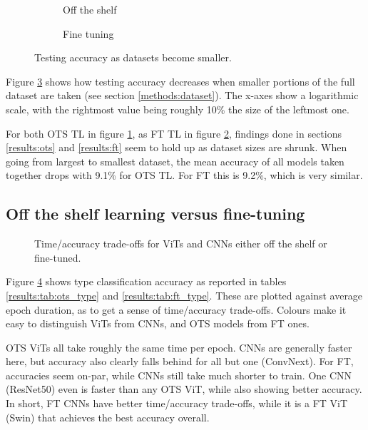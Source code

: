 \begin{figure}
    \centering
    \begin{subfigure}{0.45\textwidth}
    \def\svgwidth{7.7cm}
    
    \caption{Off the shelf}
    \label{results:img:ots_scale}
    \end{subfigure}
    \hfill
    \begin{subfigure}{0.45\textwidth}
    \def\svgwidth{7.7cm}
    
    \caption{Fine tuning}
    \label{results:img:ft_scale}
    \end{subfigure}
    \caption{Testing accuracy as datasets become smaller.}
    \label{results:img:scale}
\end{figure}

Figure \ref{results:img:scale} shows how testing accuracy decreases when smaller portions of the full dataset are taken (see section \ref{methods:dataset}). The x-axes show a logarithmic scale, with the rightmost value being roughly 10\% the size of the leftmost one.

For both OTS TL in figure \ref{results:img:ots_scale}, as FT TL in figure \ref{results:img:ft_scale}, findings done in sections \ref{results:ots} and \ref{results:ft} seem to hold up as dataset sizes are shrunk. When going from largest to smallest dataset, the mean accuracy of all models taken together drops with 9.1\% for OTS TL. For FT this is 9.2\%, which is very similar.

\subsection{Off the shelf learning versus fine-tuning}

\begin{figure}
    \centering
    \def\svgwidth{7.7cm}
    
    \caption{Time/accuracy trade-offs for ViTs and CNNs either off the shelf or fine-tuned.}
    \label{results:img:ots_vs_ft_type}
\end{figure}


Figure \ref{results:img:ots_vs_ft_type} shows type classification accuracy as reported in tables \ref{results:tab:ots_type} and \ref{results:tab:ft_type}. These are plotted against average epoch duration, as to get a sense of time/accuracy trade-offs. Colours make it easy to distinguish ViTs from CNNs, and OTS models from FT ones.

OTS ViTs all take roughly the same time per epoch. CNNs are generally faster here, but accuracy also clearly falls behind for all but one (ConvNext). For FT, accuracies seem on-par, while CNNs still take much shorter to train. One CNN (ResNet50) even is faster than any OTS ViT, while also showing better accuracy. In short, FT CNNs have better time/accuracy trade-offs, while it is a FT ViT (Swin) that achieves the best accuracy overall.

